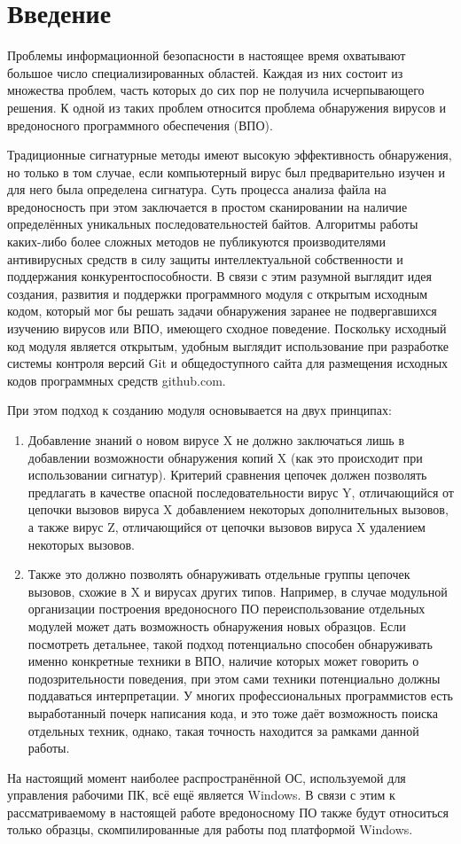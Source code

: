 \section* {Введение}
Проблемы информационной безопасности в настоящее время охватывают большое число специализированных областей. Каждая из них состоит из множества проблем, часть которых до сих пор не получила исчерпывающего решения. К одной из таких проблем относится проблема обнаружения вирусов и вредоносного программного обеспечения (ВПО).

Традиционные сигнатурные методы имеют высокую эффективность обнаружения, но только в том случае, если компьютерный вирус был предварительно изучен и для него была определена сигнатура\cite {GOSTVIRUS}. Суть процесса анализа файла на вредоносность при этом заключается в простом сканировании на наличие определённых уникальных последовательностей байтов. Алгоритмы работы каких-либо более сложных методов не публикуются производителями антивирусных средств в силу защиты интеллектуальной собственности и  поддержания конкурентоспособности. В связи с этим разумной выглядит идея создания, развития и поддержки программного модуля с открытым исходным кодом, который мог бы решать задачи обнаружения заранее не подвергавшихся изучению вирусов или ВПО, имеющего сходное поведение. Поскольку исходный код модуля является открытым, удобным выглядит использование при разработке системы контроля версий Git и общедоступного сайта для размещения исходных кодов программных средств github.com.

При этом подход к созданию модуля основывается на двух принципах:
\begin {enumerate}
	\item Добавление знаний о новом вирусе X не должно заключаться лишь в добавлении возможности обнаружения копий X (как это происходит при использовании сигнатур). Критерий сравнения цепочек должен позволять предлагать в качестве опасной последовательности вирус Y, отличающийся от цепочки вызовов вируса X добавлением некоторых дополнительных вызовов, а также вирус Z, отличающийся от цепочки вызовов вируса X удалением некоторых вызовов.
	\item Также это должно позволять обнаруживать отдельные группы цепочек вызовов, схожие в X и вирусах других типов. Например, в случае модульной организации построения вредоносного ПО переиспользование отдельных модулей может дать возможность обнаружения новых образцов. Если посмотреть детальнее, такой подход потенциально способен обнаруживать именно конкретные техники в ВПО, наличие которых может говорить о подозрительности поведения, при этом сами техники потенциально должны поддаваться интерпретации. У многих профессиональных программистов есть выработанный почерк написания кода, и это тоже даёт возможность поиска отдельных техник, однако, такая точность находится за рамками данной работы.
\end {enumerate}
На настоящий момент наиболее распространённой ОС, используемой для управления рабочими ПК, всё ещё является Windows. В связи с этим к рассматриваемому в настоящей работе вредоносному ПО также будут относиться только образцы, скомпилированные для работы под платформой Windows.

